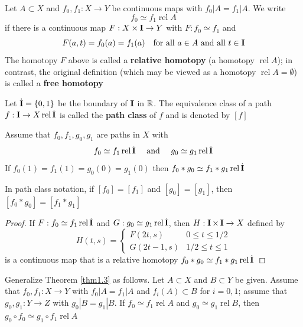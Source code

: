 \documentclass[11pt]{article}
\DeclareMathOperator{\rel}{\text{rel}}
\begin{document}
\begin{definition}[]
Let \(A\subset X\) and \(f_0,f_1:X\to Y\) be continuous maps with \(f_0|A=f_1|A\). We write
\begin{equation*}
f_0\simeq f_1\rel A
\end{equation*}
if there is a continuous map \(F:X\times\operatorname{\textbf{I}}\to Y\) with \(F:f_0\simeq f_1\) and
\begin{equation*}
F(a,t)=f_0(a)=f_1(a)\quad\text{for all }a\in A\text{ and all }t\in\operatorname{\textbf{I}}
\end{equation*}
The homotopy \(F\) above is called a \textbf{relative homotopy} (a homotopy \(\rel A\)); in contrast, the
original definition (which may be viewed as a homotopy \(\rel A=\emptyset\)) is called a \textbf{free homotopy}
\end{definition}

\begin{definition}[]
Let \(\dot{\operatorname{\textbf{I}}}=\{0,1\}\) be the boundary of \(\operatorname{\textbf{I}}\) in \(\mathbb{R}\). The equivalence class of a
path \(f:\bI\to X\rel\dbI\) is called the \textbf{path class} of \(f\) and is denoted by \([f]\)
\end{definition}

\begin{theorem}[]
Assume that \(f_0,f_1,g_0,g_1\) are paths in \(X\) with
\begin{equation*}
f_0\simeq f_1\rel\dbI \quad\text{ and }\quad
g_0\simeq g_1\rel\dbI
\end{equation*}
If \(f_0(1)=f_1(1)=g_0(0)=g_1(0)\) then \(f_0*g_0\simeq f_1*g_1\rel\dbI\)
\end{theorem}

In path class notation, if \([f_0]=[f_1]\) and \([g_0]=[g_1]\), then \([f_0*g_0]=[f_1*g_1]\)

\begin{proof}
If \(F:f_0\simeq f_1\rel\dbI\) and \(G:g_0\simeq g_1\rel\dbI\), then \(H:\operatorname{\textbf{I}}\times\operatorname{\textbf{I}}\to X\) defined by
\begin{equation*}
H(t,s)=
\begin{cases}
F(2t,s)&0\le t\le 1/2\\
G(2t-1,s)&1/2\le t\le 1
\end{cases}
\end{equation*}
is a continuous map that is a relative homotopy \(f_0*g_0\simeq f_1*g_1\rel\dbI\)
\end{proof}

\begin{exercise}
\label{ex3.1}
Generalize Theorem \ref{thm1.3} as follows. Let \(A\subset X\) and \(B\subset Y\) be given. Assume
that \(f_0,f_1:X\to Y\) with \(f_0|A=f_1|A\) and \(f_i(A)\subset B\) for \(i=0,1\); assume
that \(g_0,g_1:Y\to Z\) with \(g_0|B=g_1|B\). If \(f_0\simeq f_1\rel A\)  and \(g_0\simeq g_1\rel B\), then
\(g_0\circ f_0\simeq g_1\circ f_1\rel A\)
\end{exercise}
\end{document}
